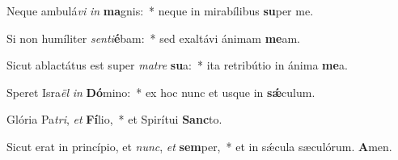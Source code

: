 \vs Neque ambulá\textit{vi} \textit{in} \textbf{ma}gnis:~* neque in mirabílibus \textbf{su}per me.

\vs Si non humíliter \textit{sen}\textit{ti}\textbf{é}bam:~* sed exaltávi ánimam \textbf{me}am.

\vs Sicut ablactátus est super \textit{ma}\textit{tre} \textbf{su}a:~* ita retribútio in ánima \textbf{me}a.

\vs Speret Isra\textit{ël} \textit{in} \textbf{Dó}mino:~* ex hoc nunc et usque in \textbf{sǽ}culum.

\vs Glória Pa\textit{tri}, \textit{et} \textbf{Fí}lio,~* et Spirítui \textbf{Sanc}to.

\vs Sicut erat in princípio, et \textit{nunc}, \textit{et} \textbf{sem}per,~* et in sǽcula sæculórum. \textbf{A}men.

